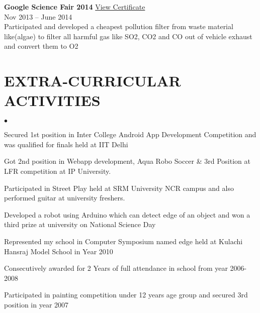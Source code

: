 \documentclass[margin,line]{res}
\newenvironment{list2}{
  \begin{list}{$\bullet$}{%
      \setlength{\itemsep}{0in}
      \setlength{\parsep}{0in} \setlength{\parskip}{0in}
      \setlength{\topsep}{0in} \setlength{\partopsep}{0in}
      \setlength{\leftmargin}{0.2in}}}{\end{list}}
\begin{document}
\begin{resume}
{\bf Google Science Fair 2014} \hfill \href{https://drive.google.com/file/d/1xFzl_syoqi-URgJgDWmmM52WXdXly-XV/view}{View Certificate}\\{Nov 2013 -- June 2014}\\
Participated  and developed a cheapest pollution filter from waste material like(algae) to filter all harmful gas like SO2, CO2 and CO out of  vehicle exhaust and convert them to O2\\


\section{\sc EXTRA-CURRICULAR ACTIVITIES}

\begin{list2}
\item Secured 1st position in Inter College Android App Development Competition and was qualified for finals held at IIT Delhi
\item Got 2nd position in Webapp development, Aqua Robo Soccer \& 3rd Position at LFR competition at IP University.
\item Participated in Street Play held at SRM University NCR campus and also performed guitar at university freshers.
\item Developed a robot using Arduino which can detect edge of an object and won a third prize at university on National Science Day
\item Represented my school in Computer Symposium named edge held at Kulachi Hansraj Model School in Year 2010
\item Consecutively awarded for 2 Years of full attendance in school from year 2006-2008
\item Participated in painting competition under 12 years age group and secured 3rd position in year 2007
\end{list2}


\end{resume}
\end{document}
